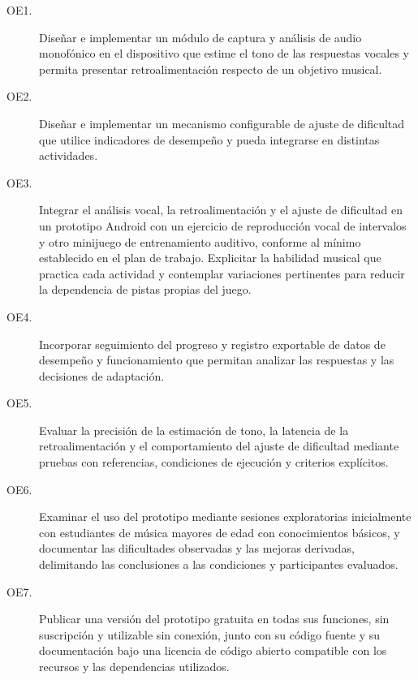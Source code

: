 \begin{description}
  \item[OE1.] Diseñar e implementar un módulo de captura y análisis de audio monofónico
  en el dispositivo que estime el tono de las respuestas vocales y permita presentar
  retroalimentación respecto de un objetivo musical.
  \item[OE2.] Diseñar e implementar un mecanismo configurable de ajuste de dificultad
  que utilice indicadores de desempeño y pueda integrarse en distintas actividades.
  \item[OE3.] Integrar el análisis vocal, la retroalimentación y el ajuste de dificultad
  en un prototipo Android con un ejercicio de reproducción vocal de intervalos y otro
  minijuego de entrenamiento auditivo, conforme al mínimo establecido en el plan de
  trabajo. Explicitar la habilidad musical que practica cada actividad y contemplar
  variaciones pertinentes para reducir la dependencia de pistas propias del juego.
  \item[OE4.] Incorporar seguimiento del progreso y registro exportable de datos de
  desempeño y funcionamiento que permitan analizar las respuestas y las decisiones
  de adaptación.
  \item[OE5.] Evaluar la precisión de la estimación de tono, la latencia de la
  retroalimentación y el comportamiento del ajuste de dificultad mediante pruebas
  con referencias, condiciones de ejecución y criterios explícitos.
  \item[OE6.] Examinar el uso del prototipo mediante sesiones exploratorias inicialmente
  con estudiantes de música mayores de edad con conocimientos básicos, y documentar
  las dificultades observadas y las mejoras derivadas, delimitando las conclusiones
  a las condiciones y participantes evaluados.
  \item[OE7.] Publicar una versión del prototipo gratuita en todas sus funciones,
  sin suscripción y utilizable sin conexión, junto con su código fuente y su
  documentación bajo una licencia de código abierto compatible con los recursos
  y las dependencias utilizados.
\end{description}
